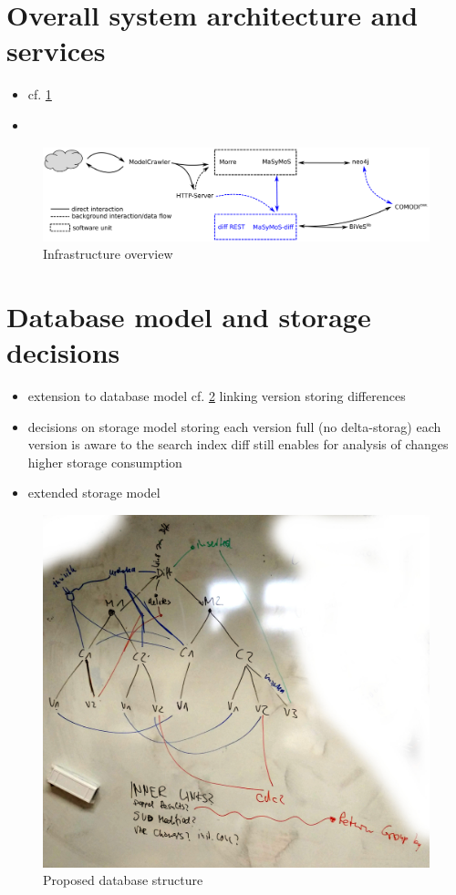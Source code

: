 \section{Overall system architecture and services}
\begin{itemize}
	\item cf. \ref{fig:system-overview}
	\item {}
\end{itemize}

\begin{figure}[h]
	\includegraphics[width=\textwidth]{resources/system-overview.pdf}
	\caption{Infrastructure overview}
	\label{fig:system-overview}
\end{figure}

\section{Database model and storage decisions}
\begin{itemize}
\item extension to database model cf. \ref{fig:db-model}
	\subitem linking version
	\subitem storing differences
\item decisions on storage model
	\subitem storing each version full (no delta-storag)
	\subitem each version is aware to the search index
	\subitem diff still enables for analysis of changes
	\subitem higher storage consumption
\item extended storage model
\end{itemize}

\begin{figure}[h]
	\includegraphics[width=\textwidth]{resources/db_structure.jpg}
	\caption{Proposed database structure}
	\label{fig:db-model}
\end{figure}